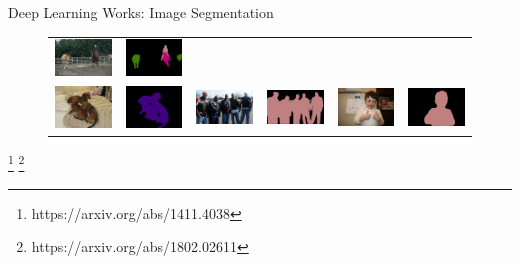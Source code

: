 \documentclass[notheorems]{beamer}
\newcommand{\source}[1]{{\let\thefootnote\relax\footnote{{\tiny #1}}}}
\begin{document}
\begin{frame}{Deep Learning Works: Image Segmentation}
\begin{figure}
{\begin{tabular}{c c | c c | c c}
                    \includegraphics[width=0.125\linewidth]{figures/semantic_segmentation/vis/img/000087_image.png} &
                    \includegraphics[width=0.125\linewidth]{figures/semantic_segmentation/vis/prediction/000087_prediction.png} \\

                    \includegraphics[width=0.125\linewidth]{figures/semantic_segmentation/vis/img/000131_image.png} &
                    \includegraphics[width=0.125\linewidth]{figures/semantic_segmentation/vis/prediction/000131_prediction.png} &

                    \includegraphics[width=0.125\linewidth]{figures/semantic_segmentation/vis/img/000195_image.png} &
                    \includegraphics[width=0.125\linewidth]{figures/semantic_segmentation/vis/prediction/000195_prediction.png} &

                    \includegraphics[width=0.125\linewidth]{figures/semantic_segmentation/vis/img/000199_image.png} &
                    \includegraphics[width=0.125\linewidth]{figures/semantic_segmentation/vis/prediction/000199_prediction.png} \\

                \end{tabular}
            }
        \end{figure}

        \source{https://arxiv.org/abs/1411.4038}
        \source{https://arxiv.org/abs/1802.02611}

    \end{frame}
\end{document}
